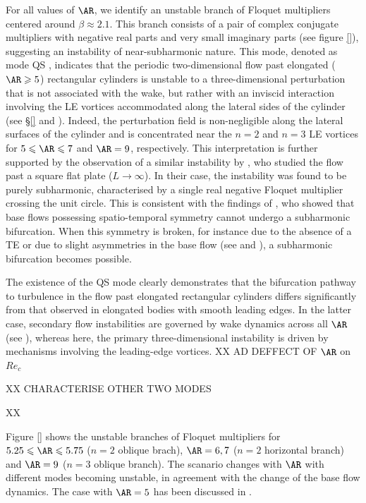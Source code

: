 For all values of $\AR$, we identify an unstable branch of Floquet multipliers centered around $\beta \approx 2.1$. This branch consists of a pair of complex conjugate multipliers with negative real parts and very small imaginary parts (see figure \ref{}), suggesting an instability of near-subharmonic nature. This mode, denoted as mode QS \citep{}, indicates that the periodic two-dimensional flow past elongated ($\AR \ge 5$) rectangular cylinders is unstable to a three-dimensional perturbation that is not associated with the wake, but rather with an inviscid interaction involving the LE vortices accommodated along the lateral sides of the cylinder (see \S\ref{} and \cite{}). Indeed, the perturbation field is non-negligible along the lateral surfaces of the cylinder and is concentrated near the $n=2$ and $n=3$ LE vortices for $5 \le \AR \le 7$ and $\AR=9$, respectively. This interpretation is further supported by the observation of a similar instability by \cite{}, who studied the flow past a square flat plate ($L \rightarrow \infty$). In their case, the instability was found to be purely subharmonic, characterised by a single real negative Floquet multiplier crossing the unit circle. This is consistent with the findings of \cite{}, who showed that base flows possessing spatio-temporal symmetry cannot undergo a subharmonic bifurcation. When this symmetry is broken, for instance due to the absence of a TE or due to slight asymmetries in the base flow (see \cite{} and \cite{}), a subharmonic bifurcation becomes possible.

The existence of the QS mode clearly demonstrates that the bifurcation pathway to turbulence in the flow past elongated rectangular cylinders differs significantly from that observed in elongated bodies with smooth leading edges. In the latter case, secondary flow instabilities are governed by wake dynamics across all $\AR$ (see \cite{}), whereas here, the primary three-dimensional instability is driven by mechanisms involving the leading-edge vortices.
XX AD DEFFECT OF $\AR$ on $Re_{c}$

XX CHARACTERISE OTHER TWO MODES 

XX

Figure \ref{} shows the unstable branches of Floquet multipliers for $5.25 \le \AR \le 5.75$ ($n=2$ oblique brach), $\AR=6,7$ ($n=2$ horizontal branch) and $\AR=9$ ($n=3$ oblique branch). The scanario changes with $\AR$ with different modes becoming unstable, in agreement with the change of the base flow dynamics. The case with $\AR=5$ has been discussed in \cite{chiarini-quadrio-auteri-2022d}.

